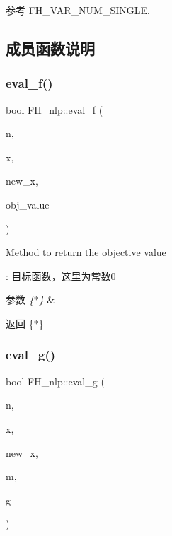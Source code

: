 参考 F\+H\+\_\+\+V\+A\+R\+\_\+\+N\+U\+M\+\_\+\+S\+I\+N\+G\+LE.



\subsection{成员函数说明}
\mbox{\label{classquadruped_1_1FH__nlp_a1c50f2e5601d9cfadf569d7dae7ba787}} 
\subsubsection{\texorpdfstring{eval\+\_\+f()}{eval\_f()}}
{\footnotesize\ttfamily bool F\+H\+\_\+nlp\+::eval\+\_\+f (\begin{DoxyParamCaption}\item[{Index}]{n,  }\item[{const Number $\ast$}]{x,  }\item[{bool}]{new\+\_\+x,  }\item[{Number \&}]{obj\+\_\+value }\end{DoxyParamCaption})\hspace{0.3cm}{\ttfamily [virtual]}}

Method to return the objective value

\+: 目标函数，这里为常数0 
\begin{DoxyParams}{参数}
{\em \{$\ast$\}} & \\
\hline
\end{DoxyParams}
\begin{DoxyReturn}{返回}
\{$\ast$\} 
\end{DoxyReturn}
\mbox{\label{classquadruped_1_1FH__nlp_a6451ea1ebe787cc94fe34199193c7acd}} 
\subsubsection{\texorpdfstring{eval\+\_\+g()}{eval\_g()}}
{\footnotesize\ttfamily bool F\+H\+\_\+nlp\+::eval\+\_\+g (\begin{DoxyParamCaption}\item[{Index}]{n,  }\item[{const Number $\ast$}]{x,  }\item[{bool}]{new\+\_\+x,  }\item[{Index}]{m,  }\item[{Number $\ast$}]{g }\end{DoxyParamCaption})\hspace{0.3cm}{\ttfamily [virtual]}}

